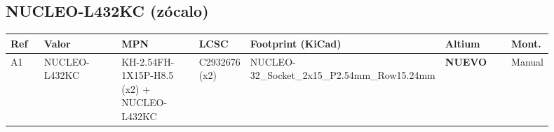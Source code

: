 \documentclass[10pt,a4paper]{article}
\begin{document}
\subsection*{NUCLEO-L432KC (zócalo)}
{\scriptsize\begin{longtable}{@{}L{0.07\linewidth}L{0.17\linewidth}L{0.17\linewidth}L{0.09\linewidth}L{0.20\linewidth}L{0.14\linewidth}L{0.06\linewidth}@{}}\toprule
\textbf{Ref} & \textbf{Valor} & \textbf{MPN} & \textbf{LCSC} & \textbf{Footprint (KiCad)} & \textbf{Altium} & \textbf{Mont.}\\\midrule\endhead
A1 & NUCLEO-L432KC & KH-2.54FH-1X15P-H8.5 (x2) + NUCLEO-L432KC & C2932676 (x2) & NUCLEO-32\_\allowbreak{}Socket\_\allowbreak{}2x15\_\allowbreak{}P2.54mm\_\allowbreak{}Row15.24mm & \textbf{NUEVO} & Manual\\
\bottomrule\end{longtable}}
\end{document}
